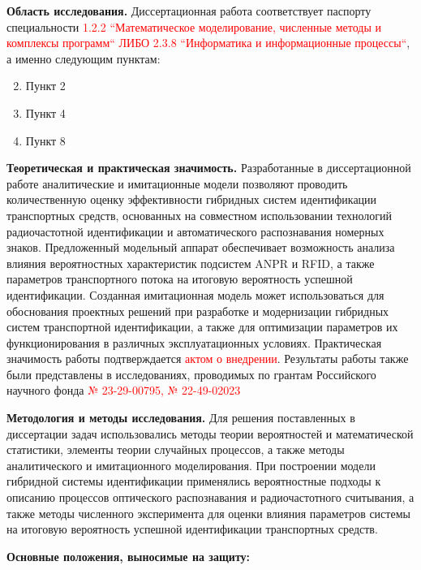 \documentclass[12pt]{article}
\theoremstyle{definition}
\begin{document}
\textbf{Область исследования.} Диссертационная работа соответствует паспорту специальности \textcolor{red}{1.2.2 ``Математическое моделирование, численные методы и комплексы программ`` ЛИБО 2.3.8 ``Информатика и информационные процессы``}, а именно следующим пунктам:

\begin{enumerate}[label=п.\arabic*., leftmargin=*]
    \setcounter{enumi}{1}
    \item Пункт 2

    \setcounter{enumi}{3}
    \item Пункт 4

    \setcounter{enumi}{7}
    \item Пункт 8
\end{enumerate}

\textbf{Теоретическая и практическая значимость.} Разработанные в диссертационной работе аналитические и имитационные модели позволяют проводить количественную оценку эффективности гибридных систем идентификации транспортных средств, основанных на совместном использовании технологий радиочастотной идентификации и автоматического распознавания номерных знаков. Предложенный модельный аппарат обеспечивает возможность анализа влияния вероятностных характеристик подсистем ANPR и RFID, а также параметров транспортного потока на итоговую вероятность успешной идентификации. Созданная имитационная модель может использоваться для обоснования проектных решений при разработке и модернизации гибридных систем транспортной идентификации, а также для оптимизации параметров их функционирования в различных эксплуатационных условиях. Практическая значимость работы подтверждается \textcolor{red}{актом о внедрении}. Результаты работы также были представлены в исследованиях, проводимых по грантам Российского научного фонда \textcolor{red}{№ 23-29-00795, № 22-49-02023}

\textbf{Методология и методы исследования.} Для решения поставленных в диссертации задач использовались методы теории вероятностей и математической статистики, элементы теории случайных процессов, а также методы аналитического и имитационного моделирования. При построении модели гибридной системы идентификации применялись вероятностные подходы к описанию процессов оптического распознавания и радиочастотного считывания, а также методы численного эксперимента для оценки влияния параметров системы на итоговую вероятность успешной идентификации транспортных средств.

\textbf{Основные положения, выносимые на защиту:}
\end{document}
